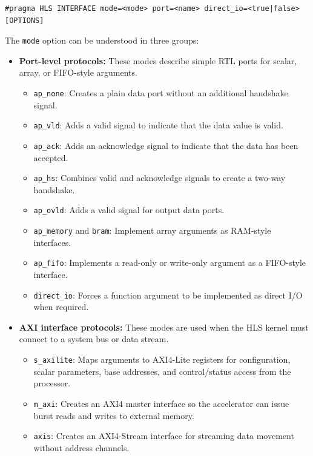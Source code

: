 \begin{lstlisting}[caption={General syntax of the HLS interface pragma},label={lst:hls_interface_syntax}]
#pragma HLS INTERFACE mode=<mode> port=<name> direct_io=<true|false> [OPTIONS]
\end{lstlisting}

The \texttt{mode} option can be understood in three groups:

\begin{itemize}
    \item \textbf{Port-level protocols:} These modes describe simple RTL ports for scalar, array, or FIFO-style arguments.
    \begin{itemize}
        \item \texttt{ap\_none}: Creates a plain data port without an additional handshake signal.
        \item \texttt{ap\_vld}: Adds a valid signal to indicate that the data value is valid.
        \item \texttt{ap\_ack}: Adds an acknowledge signal to indicate that the data has been accepted.
        \item \texttt{ap\_hs}: Combines valid and acknowledge signals to create a two-way handshake.
        \item \texttt{ap\_ovld}: Adds a valid signal for output data ports.
        \item \texttt{ap\_memory} and \texttt{bram}: Implement array arguments as RAM-style interfaces.
        \item \texttt{ap\_fifo}: Implements a read-only or write-only argument as a FIFO-style interface.
        \item \texttt{direct\_io}: Forces a function argument to be implemented as direct I/O when required.
    \end{itemize}

    \item \textbf{AXI interface protocols:} These modes are used when the HLS kernel must connect to a system bus or data stream.
    \begin{itemize}
        \item \texttt{s\_axilite}: Maps arguments to AXI4-Lite registers for configuration, scalar parameters, base addresses, and control/status access from the processor.
        \item \texttt{m\_axi}: Creates an AXI4 master interface so the accelerator can issue burst reads and writes to external memory.
        \item \texttt{axis}: Creates an AXI4-Stream interface for streaming data movement without address channels.
    \end{itemize}


\end{itemize}
